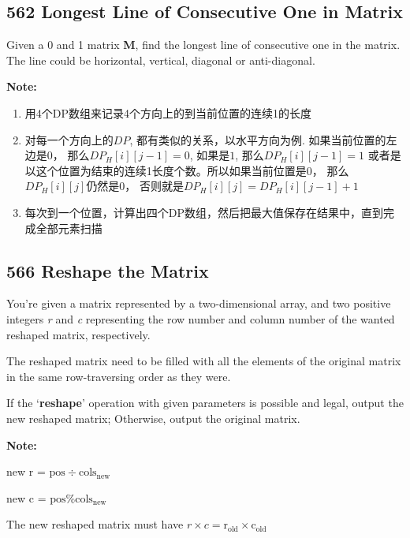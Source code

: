 \documentclass[a4paper,12pt]{article}
\begin{document}
	\subsection{562 Longest Line of Consecutive One in Matrix}
	Given a 0 and 1 matrix \textbf{M}, find the longest line of consecutive one in the matrix. The line could be horizontal, vertical, diagonal or anti-diagonal.
	\par
	\vspace{0.5em}
	\noindent
	\textbf{\large{Note:}}
	\begin{CJK*}{UTF8}{gbsn}
		\begin{enumerate}
			\item 用4个DP数组来记录4个方向上的到当前位置的连续1的长度
			\item 对每一个方向上的$DP$, 都有类似的关系，以水平方向为例. 如果当前位置的左边是$0$， 那么${DP_{H}[i][j-1]}=0$, 如果是$1$, 那么${DP_{H}[i][j-1]}=1$ 或者是以这个位置为结束的连续1长度个数。所以如果当前位置是$0$， 那么$DP_{H}[i][j]$仍然是$0$， 否则就是$DP_{H}[i][j] = DP_{H}[i][j-1]+1$
			\item 每次到一个位置，计算出四个DP数组，然后把最大值保存在结果中，直到完成全部元素扫描
		\end{enumerate}
		\clearpage\end{CJK*}
	
	\subsection{566 Reshape the Matrix}
	You're given a matrix represented by a two-dimensional array, and two positive integers \textit{r} and \textit{c} representing the row number and column number of the wanted reshaped matrix, respectively.
	\par
	The reshaped matrix need to be filled with all the elements of the original matrix in the same row-traversing order as they were.
	\par
	If the `\textbf{reshape}' operation with given parameters is possible and legal, output the new reshaped matrix; Otherwise, output the original matrix.
	\par
	\noindent
	\textbf{Note:}
	\begin{enumerate}[label={[\arabic*]}]
		\item new r = $\text{pos} \div \text{cols}_{\text{new}}$
		\item new c = $\text{pos} \% \text{cols}_{\text{new}}$
		\item The new reshaped matrix must have $r \times c = \text{r}_{\text{old}} \times \text{c}_{\text{old}}$ 
	\end{enumerate}
	
\end{document}
